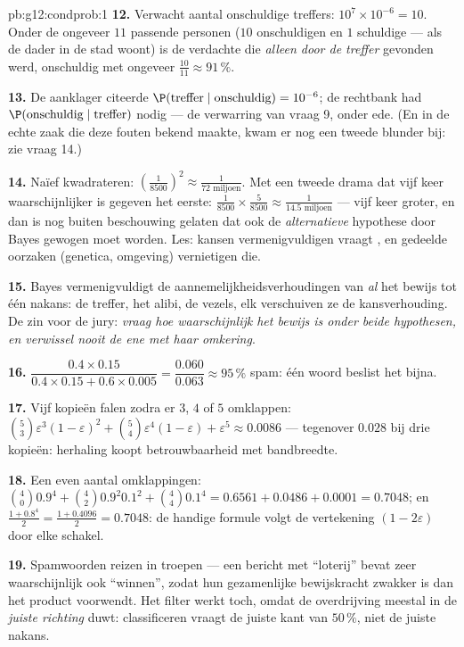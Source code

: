 \begin{solution}{pb:g12:condprob:1}
\textbf{12.} Verwacht aantal onschuldige treffers:
$10^7 \times 10^{-6} = 10$. Onder de ongeveer $11$ passende personen ($10$
onschuldigen en $1$ schuldige --- als de dader in de stad woont) is de
verdachte die \emph{alleen door de treffer} gevonden werd, onschuldig met
 ongeveer $\frac{10}{11} \approx 91\,\%$.

\textbf{13.} De aanklager citeerde
$\P(\text{treffer} \mid \text{onschuldig}) = 10^{-6}$; de rechtbank had
$\P(\text{onschuldig} \mid \text{treffer})$ nodig --- de verwarring van vraag
9, onder ede. (En in de echte zaak die deze fouten bekend maakte, kwam er nog
een tweede blunder bij: zie vraag 14.)

\textbf{14.} Naïef kwadrateren: $\left(\frac{1}{8500}\right)^2 \approx
\frac{1}{72 \text{ miljoen}}$. Met een tweede drama dat vijf keer
waarschijnlijker is gegeven het eerste:
$\frac{1}{8500} \times \frac{5}{8500} \approx \frac{1}{14.5 \text{ miljoen}}$
--- vijf keer groter, en dan is nog buiten beschouwing gelaten dat ook de
\emph{alternatieve} hypothese door Bayes gewogen moet worden. Les: kansen
vermenigvuldigen vraagt , en gedeelde oorzaken (genetica,
omgeving) vernietigen die.

\textbf{15.} Bayes vermenigvuldigt de aannemelijkheidsverhoudingen van
\emph{al} het bewijs tot één nakans: de treffer, het alibi, de vezels, elk
verschuiven ze de kansverhouding. De zin voor de jury: \emph{vraag hoe
waarschijnlijk het bewijs is onder beide hypothesen, en verwissel nooit de ene
 met haar omkering}.

\textbf{16.} $\dfrac{0.4 \times 0.15}{0.4 \times 0.15 + 0.6 \times 0.005} =
\dfrac{0.060}{0.063} \approx 95\,\%$ spam: één woord beslist het bijna.

\textbf{17.} Vijf kopieën falen zodra er $3$, $4$ of $5$ omklappen:
$\binom53 \varepsilon^3(1-\varepsilon)^2 + \binom54
\varepsilon^4 (1 - \varepsilon) + \varepsilon^5 \approx 0.0086$ --- tegenover
$0.028$ bij drie kopieën: herhaling koopt betrouwbaarheid met bandbreedte.

\textbf{18.} Een even aantal omklappingen: $\binom40 0.9^4 + \binom42 0.9^2
0.1^2 + \binom44 0.1^4 = 0.6561 + 0.0486 + 0.0001 = 0.7048$; en
$\frac{1 + 0.8^4}{2} = \frac{1 + 0.4096}{2} = 0.7048$: de handige formule
volgt de vertekening $(1 - 2\varepsilon)$ door elke schakel.

\textbf{19.} Spamwoorden reizen in troepen --- een bericht met ``loterij''
bevat zeer waarschijnlijk ook ``winnen'', zodat hun gezamenlijke bewijskracht
zwakker is dan het product voorwendt. Het filter werkt toch, omdat de
overdrijving meestal in de \emph{juiste richting} duwt: classificeren vraagt
de juiste kant van $50\,\%$, niet de juiste nakans.


\end{solution}

